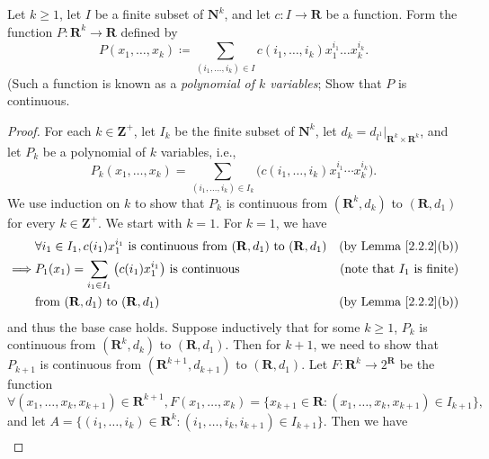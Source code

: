 \begin{exercise}\label{ex 2.2.7}
    Let \(k \geq 1\), let \(I\) be a finite subset of \(\mathbf{N}^k\), and let \(c : I \to \mathbf{R}\) be a function.
    Form the function \(P : \mathbf{R}^k \to \mathbf{R}\) defined by
    \[
        P(x_1, \dots, x_k) \coloneqq \sum_{(i_1, \dots, i_k) \in I} c(i_1, \dots, i_k) x_1^{i_1} \dots x_k^{i_k}.
    \]
    (Such a function is known as a \emph{polynomial of \(k\) variables};
    Show that \(P\) is continuous.
\end{exercise}

\begin{proof}
    For each \(k \in \mathbf{Z}^+\), let \(I_k\) be the finite subset of \(\mathbf{N}^k\), let \(d_k = d_{l^1}|_{\mathbf{R}^k \times \mathbf{R}^k}\), and let \(P_k\) be a polynomial of \(k\) variables, i.e.,
    \[
        P_k(x_1, \dots, x_k) = \sum_{(i_1, \dots, i_k) \in I_k} \big(c(i_1, \dots, i_k) x_1^{i_1} \cdots x_k^{i_k}\big).
    \]
    We use induction on \(k\) to show that \(P_k\) is continuous from \((\mathbf{R}^k, d_k)\) to \((\mathbf{R}, d_1)\) for every \(k \in \mathbf{Z}^+\).
    We start with \(k = 1\).
    For \(k = 1\), we have
    \begin{align*}
                 & \forall i_1 \in I_1, c(i_1) x_1^{i_1} \text{ is continuous from } (\mathbf{R}, d_1) \text{ to } (\mathbf{R}, d_1) & \text{(by Lemma \ref{2.2.2}(b))}     \\
        \implies & P_1(x_1) = \sum_{i_1 \in I_1} \big(c(i_1) x_1^{i_1}\big) \text{ is continuous}                                    & \text{(note that \(I_1\) is finite)} \\
                 & \text{from } (\mathbf{R}, d_1) \text{ to } (\mathbf{R}, d_1)                                                      & \text{(by Lemma \ref{2.2.2}(b))}
    \end{align*}
    and thus the base case holds.
    Suppose inductively that for some \(k \geq 1\), \(P_k\) is continuous from \((\mathbf{R}^k, d_k)\) to \((\mathbf{R}, d_1)\).
    Then for \(k + 1\), we need to show that \(P_{k + 1}\) is continuous from \((\mathbf{R}^{k + 1}, d_{k + 1})\) to \((\mathbf{R}, d_1)\).
    Let \(F : \mathbf{R}^k \to 2^\mathbf{R}\) be the function
    \[
        \forall (x_1, \dots, x_k, x_{k + 1}) \in \mathbf{R}^{k + 1}, F(x_1, \dots, x_k) = \big\{x_{k + 1} \in \mathbf{R} : (x_1, \dots, x_k, x_{k + 1}) \in I_{k + 1}\big\},
    \]
    and let \(A = \big\{(i_1, \dots, i_k) \in \mathbf{R}^k : (i_1, \dots, i_k, i_{k + 1}) \in I_{k + 1}\big\}\).
    Then we have
    \begin{align*}

\end{align*}
\end{proof}
